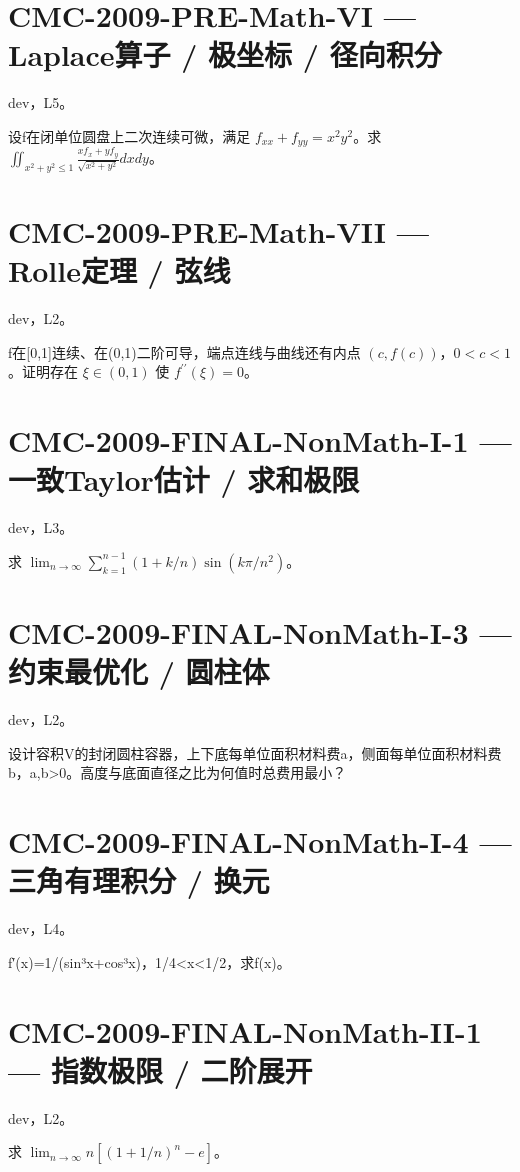 \documentclass[UTF8]{ctexart}
\begin{document}
\section*{CMC-2009-PRE-Math-VI — Laplace算子 / 极坐标 / 径向积分}

dev，L5。

设f在闭单位圆盘上二次连续可微，满足 $f_{xx}+f_{yy}=x^2y^2$。求 $\iint_{x^2+y^2\le1}\frac{xf_x+yf_y}{\sqrt{x^2+y^2}}dxdy$。

\section*{CMC-2009-PRE-Math-VII — Rolle定理 / 弦线}

dev，L2。

f在[0,1]连续、在(0,1)二阶可导，端点连线与曲线还有内点 $(c,f(c))$，$0<c<1$。证明存在 $\xi\in(0,1)$ 使 $f^{\prime\prime}(\xi)=0$。

\section*{CMC-2009-FINAL-NonMath-I-1 — 一致Taylor估计 / 求和极限}

dev，L3。

求 $\lim_{n\to\infty}\sum_{k=1}^{n-1}(1+k/n)\sin(k\pi/n^2)$。

\section*{CMC-2009-FINAL-NonMath-I-3 — 约束最优化 / 圆柱体}

dev，L2。

设计容积V的封闭圆柱容器，上下底每单位面积材料费a，侧面每单位面积材料费b，a,b>0。高度与底面直径之比为何值时总费用最小？

\section*{CMC-2009-FINAL-NonMath-I-4 — 三角有理积分 / 换元}

dev，L4。

f′(x)=1/(sin³x+cos³x)，1/4<x<1/2，求f(x)。

\section*{CMC-2009-FINAL-NonMath-II-1 — 指数极限 / 二阶展开}

dev，L2。

求 $\lim_{n\to\infty}n[(1+1/n)^n-e]$。
\end{document}

